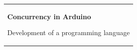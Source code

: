 %
\begin{titlepage}
\vspace*{\fill}
  \addtolength{\hoffset}{0.5\evensidemargin-0.5\oddsidemargin} %
  \noindent%
  {\color{white}\colorbox{aaublue}{\begin{tabular}{@{}p{\textwidth}@{}}
    \begin{center}
    \Huge{\textbf{
      Concurrency in Arduino%
    }}
    \end{center}
    \begin{center}
      \Large{
        Development of a programming language%
}
\end{center}
\end{tabular}}}
\end{titlepage}
